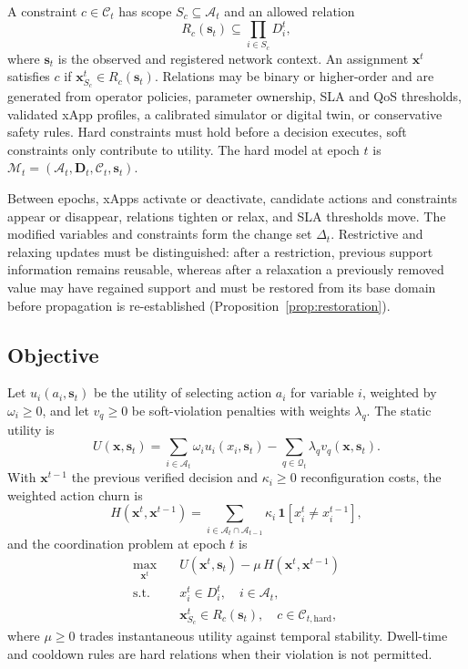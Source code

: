 \documentclass[pdflatex,sn-mathphys-num,iicol,oneside]{sn-jnl}
\begin{document}
A constraint $c\in\mathcal{C}_t$ has scope $S_c\subseteq\mathcal{A}_t$
and an allowed relation
\begin{equation}
R_c(\bm{s}_t)\subseteq\prod_{i\in S_c}D_i^t,
\end{equation}
where $\bm{s}_t$ is the observed and registered network context. An
assignment $\bm{x}^t$ satisfies $c$ if
$\bm{x}_{S_c}^t\in R_c(\bm{s}_t)$. Relations may be binary or
higher-order and are generated from operator policies, parameter
ownership, SLA and QoS thresholds, validated xApp profiles, a
calibrated simulator or digital twin, or conservative safety rules.
Hard constraints must hold before a decision executes, soft
constraints only contribute to utility. The hard model at epoch $t$ is
$\mathcal{M}_t=(\mathcal{A}_t,\bm{D}_t,\mathcal{C}_t,\bm{s}_t)$.

Between epochs, xApps activate or deactivate, candidate actions and
constraints appear or disappear, relations tighten or relax, and SLA
thresholds move. The modified variables and constraints form the
change set $\Delta_t$. Restrictive and relaxing updates must be
distinguished: after a restriction, previous support information
remains reusable, whereas after a relaxation a previously removed
value may have regained support and must be restored from its base
domain before propagation is re-established
(Proposition~\ref{prop:restoration}).

\subsection{Objective}

Let $u_i(a_i,\bm{s}_t)$ be the utility of selecting action $a_i$ for
variable $i$, weighted by $\omega_i\geq0$, and let $v_q\ge 0$ be
soft-violation penalties with weights $\lambda_q$. The static utility
is
\begin{equation}
U(\bm{x},\bm{s}_t)=\sum_{i\in\mathcal{A}_t}\omega_i u_i(x_i,\bm{s}_t)
-\sum_{q\in\mathcal{Q}_t}\lambda_q v_q(\bm{x},\bm{s}_t).
\label{eq:static-utility}
\end{equation}
With $\bm{x}^{t-1}$ the previous verified decision and
$\kappa_i\geq 0$ reconfiguration costs, the weighted action churn is
\begin{equation}
H(\bm{x}^{t},\bm{x}^{t-1})=
\sum_{i\in\mathcal{A}_t\cap\mathcal{A}_{t-1}}
\kappa_i\,\mathbf{1}\!\left[x_i^t\neq x_i^{t-1}\right],
\label{eq:churn}
\end{equation}
and the coordination problem at epoch $t$ is
\begin{align}
\max_{\bm{x}^{t}}\quad&
U(\bm{x}^{t},\bm{s}_t)-\mu\,H(\bm{x}^{t},\bm{x}^{t-1})
\label{eq:problem-objective}\\
\text{s.t.}\quad&
x_i^t\in D_i^t, \quad i\in\mathcal{A}_t,
\nonumber\\
&\bm{x}_{S_c}^t\in R_c(\bm{s}_t),\quad c\in\mathcal{C}_{t,\mathrm{hard}},
\label{eq:problem-hard}
\end{align}
where $\mu\geq0$ trades instantaneous utility against temporal
stability. Dwell-time and cooldown rules are hard relations when their
violation is not permitted.
\end{document}
